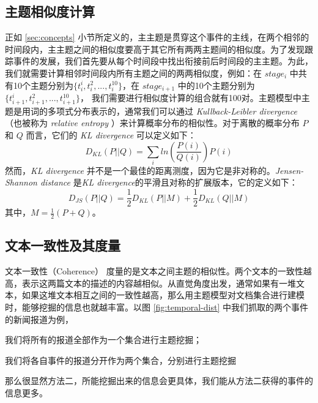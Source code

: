 \subsection{主题相似度计算}
\label{sec:similairty-calc}
正如 \ref{sec:concepts} 小节所定义的，主主题是贯穿这个事件的主线，在两个相邻的时间段内，主主题之间的相似度要高于其它所有两两主题间的相似度。为了发现跟踪事件的发展，我们首先要从每个时间段中找出衔接前后时间段的主主题。为此，我们就需要计算相邻时间段内所有主题之间的两两相似度，例如：在 $stage_i$ 中共有10个主题分别为$\{t_i^i, t_i^2, ..., t_i^{10}\}$，在 $stage_{i+1}$ 中的10个主题分别为 $\{t_{i+1}^i, t_{i+1}^2, ..., t_{i+1}^{10}\}$， 我们需要进行相似度计算的组合就有100对。主题模型中主题是用词的多项式分布表示的，通常我们可以通过 \emph{\emph{Kullback-Leibler divergence}}（也被称为 \emph{relative entropy} ）来计算概率分布的相似性。对于离散的概率分布 $P$ 和 $Q$ 而言，它们的 \emph{KL divergence}  可以定义如下：
\begin{equation}
D_{KL} \left ( P||Q \right ) = \sum_{i}ln\left ( \frac{P(i)}{Q(i)} \right ) P(i)
\end{equation}
然而，\emph{KL divergence} 并不是一个最佳的距离测度，因为它是非对称的。\emph{Jensen-Shannon distance} 是\emph{KL divergence}的平滑且对称的扩展版本，它的定义如下：
\begin{equation}
D_{JS} \left ( P||Q \right ) = \frac{1}{2} D_{KL} \left ( P||M \right ) + \frac{1}{2} D_{KL} \left ( Q||M \right )
\end{equation}
其中，$M = \frac{1}{2}(P+Q)$。

\subsection{文本一致性及其度量}
文本一致性（Coherence） 度量的是文本之间主题的相似性。两个文本的一致性越高，表示这两篇文本的描述的内容越相似。从直觉角度出发，通常如果有一堆文本，如果这堆文本相互之间的一致性越高，那么用主题模型对文档集合进行建模时，能够挖掘的信息也就越丰富。以图 \ref{fig:temporal-dist} 中我们抓取的两个事件的新闻报道为例，
\begin{inparaenum}[\itshape 1 \upshape)]
\item 我们将所有的报道全部作为一个集合进行主题挖掘；
\item 我们将各自事件的报道分开作为两个集合，分别进行主题挖掘
\end{inparaenum}那么很显然方法二，所能挖掘出来的信息会更具体，我们能从方法二获得的事件的信息更多。

